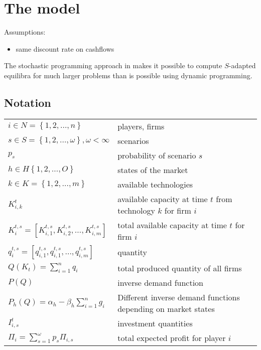 \section{The model}

Assumptions:

\begin{itemize}
	\item same discount rate on cashflows
\end{itemize}

The stochastic programming approach in \cite{Genc2007} makes it possible to compute $S$-adapted equilibra for much larger problems than is possible using dynamic programming.

\subsection{Notation}

\begin{longtable}[c]{l l}
$i\in N=\left\{ 1,2,\dots,n\right\}$                           & players, firms\\
$s\in S=\left\{ 1,2,\dots,\omega\right\}, \omega<\infty$       & scenarios\\
$p_s$                                                          & probability of scenario $s$\\
$h\in H \left\{ 1,2,\dots,O\right\}$													 & states of the market \\
$k\in K=\left\{ 1,2,\dots,m\right\}$                           & available technologies\\
$K_{i,k}^t$                                                     & available capacity at time $t$ from technology $k$ for firm $i$\\
$K_i^{t,s}=\left[K_{i,1}^{t,s},K_{i,2}^{t,s},\dots,K_{i,m}^{t,s}\right]$                                    & total available capacity at time $t$ for firm $i$\\

$q_{i}^{t,s}=\left[q_{i,1}^{t,s}, q_{i,1}^{t,s}, \dots, q_{i,m}^{t,s}\right]$                                                     & quantity\\
$Q(K_t)=\sum_{i=1}^nq_i$                                        & total produced quantity of all firms\\
$P(Q)$                                                          & inverse demand function\\
$P_h(Q)= \alpha_h - \beta_h \sum_{i=1}^n g_i$										& Different inverse demand functions depending on market states \\
$I_{i,s}^t$                                                     & investment quantities\\
$\Pi_i=\sum_{s=1}^\omega p_s\Pi_{i,s}$                          & total expected profit for player $i$

\end{longtable}



